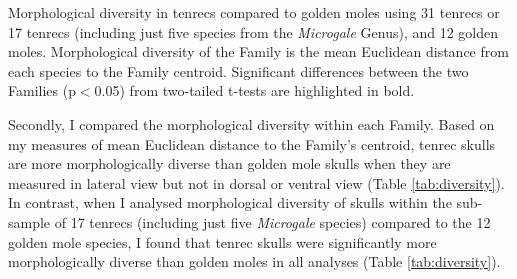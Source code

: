 	
	
\begin{landscape}
	\begin{table}[!htbp]			
		\caption[Comparison of morphological diversity in tenrecs and golden moles.]
		{Morphological diversity in tenrecs compared to golden moles using 31 tenrecs or 17 tenrecs (including just five species from the \textit{Microgale} Genus), and 12 golden moles. Morphological diversity of the Family is the mean Euclidean distance from each species to the Family centroid. Significant differences between the two Families (p$<$0.05) from two-tailed t-tests are highlighted in bold.}
		 
		\label{tab:diversity}  
	\end{table}
\end{landscape}


	Secondly, I compared the morphological diversity within each Family. Based on my measures of mean Euclidean distance to the Family's centroid, tenrec skulls are more morphologically diverse than golden mole skulls when they are measured in lateral view but not in dorsal or ventral view (Table \ref{tab:diversity}). In contrast, when I analysed morphological diversity of skulls within the sub-sample of 17 tenrecs (including just five \textit{Microgale} species) compared to the 12 golden mole species, I found that tenrec skulls were significantly more morphologically diverse than golden moles in all analyses (Table \ref{tab:diversity}).
		
